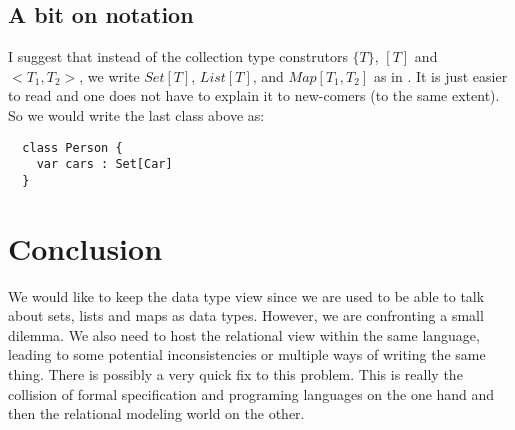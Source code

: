 \documentclass{llncs}
\begin{document}
\subsection{A bit on notation}

I suggest that instead of the collection type construtors
$\{T\}$, $[T]$ and $<T_1,T_2>$, we write $Set[T]$, $List[T]$, and $Map[T_1,T_2]$ as in \scala{}. It is just easier to read and one does not have to explain it to new-comers (to the same extent). So we would write the last class above as:

\sk
\begin{lstlisting}
  class Person {
    var cars : Set[Car] 
  }
\end{lstlisting}

\section{Conclusion}
\label{sec:conclusion}

We would like to keep the data type view since we are used to be able to
talk about sets, lists and maps as data types. However, we are confronting a small dilemma. We also need to host the relational view within the same language, leading to some potential inconsistencies
or multiple ways of writing the same thing. There is possibly a
very quick fix to this problem. This is really the collision of formal
specification and programing languages on the one hand and then the 
relational modeling world on the other.
\end{document}
